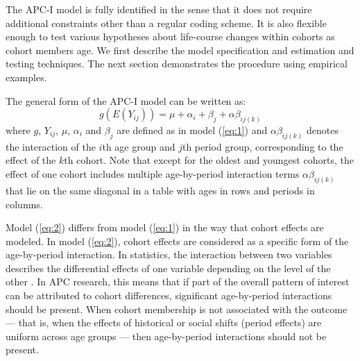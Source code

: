 The APC-I model is fully identified in the sense that it does not require additional constraints other than a regular coding scheme. It is also flexible enough to test various hypotheses about life-course changes within cohorts as cohort members age.  We first describe the model specification and estimation and testing techniques.  The next section demonstrates the procedure using empirical examples. 

The general form of the APC-I model can be written as:
\begin{equation} \label{eq:2}
g\left(E\left(Y_{i j}\right)\right)=\mu+\alpha_{i}+\beta_{j}+\alpha \beta_{i j(k)}
\end{equation}
where $g$, $Y_{ij}$, $\mu$, $\alpha_{i}$ and $\beta_{j}$ are defined as in model (\ref{eq:1}) and $\alpha \beta_{i j(k)}$ denotes the interaction of the $i$th age group and $j$th period group, corresponding to the effect of the $k$th cohort. Note that except for the oldest and youngest cohorts, the effect of one cohort includes multiple age-by-period interaction terms $\alpha \beta_{i j(k)}$ that lie on the same diagonal in a table with ages in rows and periods in columns.  

Model (\ref{eq:2}) differs from model (\ref{eq:1}) in the way that cohort effects are modeled. In model (\ref{eq:2}), cohort effects are considered as a specific form of the age-by-period interaction. In statistics, the interaction between two variables describes the differential effects of one variable depending on the level of the other \citep{scheffe_analysis_1999}.  In APC research, this means that if part of the overall pattern of interest can be attributed to cohort differences, significant age-by-period interactions should be present.  When cohort membership is not associated with the outcome — that is, when the effects of historical or social shifts (period effects) are uniform across age groups — then age-by-period interactions should not be present.   

